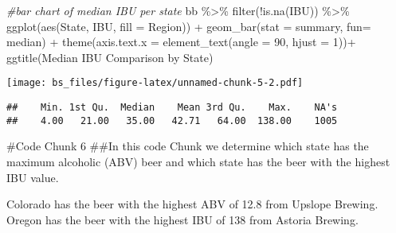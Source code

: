 \documentclass[
]{article}
\newenvironment{Shaded}{\begin{snugshade}}{\end{snugshade}}
\newcommand{\AttributeTok}[1]{\textcolor[rgb]{0.77,0.63,0.00}{#1}}
\newcommand{\CommentTok}[1]{\textcolor[rgb]{0.56,0.35,0.01}{\textit{#1}}}
\newcommand{\DecValTok}[1]{\textcolor[rgb]{0.00,0.00,0.81}{#1}}
\newcommand{\FunctionTok}[1]{\textcolor[rgb]{0.00,0.00,0.00}{#1}}
\newcommand{\NormalTok}[1]{#1}
\newcommand{\SpecialCharTok}[1]{\textcolor[rgb]{0.00,0.00,0.00}{#1}}
\newcommand{\StringTok}[1]{\textcolor[rgb]{0.31,0.60,0.02}{#1}}
\begin{document}
\begin{Shaded}
\begin{Highlighting}[]
\CommentTok{\#bar chart of median IBU per state}
\NormalTok{bb }\SpecialCharTok{\%\textgreater{}\%} \FunctionTok{filter}\NormalTok{(}\SpecialCharTok{!}\FunctionTok{is.na}\NormalTok{(IBU)) }\SpecialCharTok{\%\textgreater{}\%}
   \FunctionTok{ggplot}\NormalTok{(}\FunctionTok{aes}\NormalTok{(State, IBU, }\AttributeTok{fill =}\NormalTok{ Region)) }\SpecialCharTok{+}
   \FunctionTok{geom\_bar}\NormalTok{(}\AttributeTok{stat =} \StringTok{\textquotesingle{}summary\textquotesingle{}}\NormalTok{, }\AttributeTok{fun=} \StringTok{\textquotesingle{}median\textquotesingle{}}\NormalTok{) }\SpecialCharTok{+}
   \FunctionTok{theme}\NormalTok{(}\AttributeTok{axis.text.x =} \FunctionTok{element\_text}\NormalTok{(}\AttributeTok{angle =} \DecValTok{90}\NormalTok{, }\AttributeTok{hjust =} \DecValTok{1}\NormalTok{))}\SpecialCharTok{+}
   \FunctionTok{ggtitle}\NormalTok{(}\StringTok{\textquotesingle{}Median IBU Comparison by State\textquotesingle{}}\NormalTok{)}
\end{Highlighting}
\end{Shaded}

\texttt{[image: bs\_files/figure-latex/unnamed-chunk-5-2.pdf]}

\begin{Shaded}
\end{Shaded}

\begin{verbatim}
##    Min. 1st Qu.  Median    Mean 3rd Qu.    Max.    NA's 
##    4.00   21.00   35.00   42.71   64.00  138.00    1005
\end{verbatim}

\#Code Chunk 6 \#\#In this code Chunk we determine which state has the
maximum alcoholic (ABV) beer and which state has the beer with the
highest IBU value.

Colorado has the beer with the highest ABV of 12.8 from Upslope Brewing.
Oregon has the beer with the highest IBU of 138 from Astoria Brewing.

\begin{Shaded}
\end{Shaded}
\end{document}
